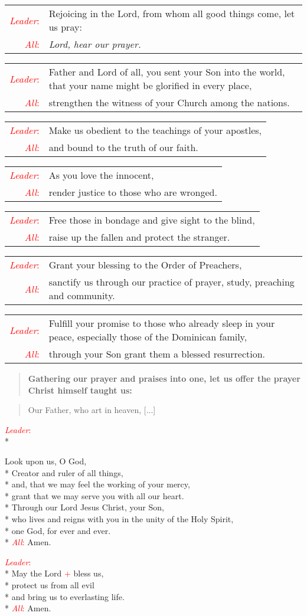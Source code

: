 \documentclass[letterpaper,14pt]{extarticle}
\newcommand{\side}[1]{\flagverse{\textcolor{red}{\textit{#1}}:}}
\newcommand{\sidestar}[1]{\textcolor{red}{\textit{#1}:}}
\newcommand{\rednote}[1]{\textcolor{red}{#1}}
\newlength{\oldindent}
\newcommand{\antiphon}[2]{
	\setlength{\oldindent}{\vindent}
	\setlength{\vindent}{0em}
	\begin{verse}
	\side{#1} \textbf{#2}
	\end{verse}
	\setlength{\vindent}{\oldindent}
}
\newcommand{\intercession}[2]{
	\begin{tabular}[h]{r p{4.25in}}
		\sidestar{Leader} & #1 \\
		\sidestar{All} & #2
	\end{tabular}}
\begin{document}
\intercession{Rejoicing in the Lord, from whom all good things come, let us pray:}
{\textit{Lord, hear our prayer.}}

\intercession{Father and Lord of all, you sent your Son into the world, that your name might be glorified in every place,}
{strengthen the witness of your Church among the nations.}

\intercession{Make us obedient to the teachings of your apostles,}
{and bound to the truth of our faith.}

\intercession{As you love the innocent,}
{render justice to those who are wronged.}

\intercession{Free those in bondage and give sight to the blind,}
{raise up the fallen and protect the stranger.}

\intercession{Grant your blessing to the Order of Preachers,}
{sanctify us through our practice of prayer, study, preaching and community.}

\intercession{Fulfill your promise to those who already sleep in your peace, 
especially those of the Dominican family,}
{through your Son grant them a blessed resurrection.}

\antiphon{Leader}{Gathering our prayer and praises into one, let us offer the
prayer Christ himself taught us:}
\begin{verse}
	\side{All} Our Father, who art in heaven, [...] \\
\end{verse}

\sidestar{Leader}\\*

Look upon us, O God,\\*
Creator and ruler of all things,\\*
and, that we may feel the working of your mercy,\\*
grant that we may serve you with all our heart.\\*
Through our Lord Jesus Christ, your Son, \\*
who lives and reigns with you in the unity of the Holy Spirit, \\*
one God, for ever and ever. \\*
\sidestar{All} Amen.


\sidestar{Leader}\\*
May the Lord \rednote{+} bless us, \\*
protect us from all evil \\*
and bring us to everlasting life. \\*
\sidestar{All} Amen.
\end{document}
